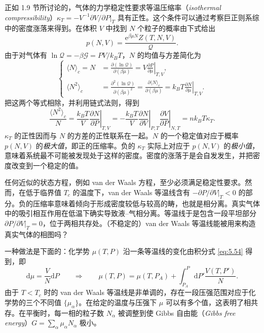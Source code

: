 正如 1.9 节所讨论的，气体的力学稳定性要求等温压缩率（\textit{isothermal compressibility}）$\kappa_T=-V^{-1}\left.\partial V/\partial P\right|_T$ 具有正性。这个条件可以通过考察巨正则系综中的密度涨落来得到。在体积 $V$ 中找到 $N$ 个粒子的概率由下式给出
\begin{equation}\label{eq:5.53}
p(N,V)=\frac{\mathrm{e}^{\beta\mu N}Z(T,N,V)}{\mathcal{Q}}.
\end{equation}
由于对气体有 $\ln\mathcal{Q}=-\beta\mathcal{G}=PV/k_BT$，$N$ 的均值与方差简化为
\begin{equation}\label{eq:5.54}
\left\{
\begin{aligned}
\langle N\rangle_c=N&=\frac{\partial(\ln\mathcal{Q})}{\partial(\beta\mu)}=V\left.\frac{\partial P}{\partial\mu}\right|_{T,V},\\
\langle N^2\rangle_c&=\frac{\partial^2(\ln\mathcal{Q})}{\partial(\beta\mu)^2}=\frac{\partial\langle N\rangle_c}{\partial(\beta\mu)}=k_BT\left.\frac{\partial N}{\partial\mu}\right|_{T,V}.
\end{aligned}
\right.
\end{equation}
把这两个等式相除，并利用链式法则，得到
\begin{equation}\label{eq:5.55}
\frac{\langle N^2\rangle_c}{N}=\frac{k_BT}{V}\left.\frac{\partial N}{\partial P}\right|_{T,V}=-\frac{k_BT}{V}\left.\frac{\partial N}{\partial V}\right|_{P,T}\left.\frac{\partial V}{\partial P}\right|_{N,T}=nk_BT\kappa_T.
\end{equation}
$\kappa_T$ 的正性因而与 $N$ 的方差的正性联系在一起。$N$ 的一个稳定值对应于概率 $p(N,V)$ 的\emph{极大值}，即正的压缩率。负的 $\kappa_T$ 实际上对应于 $p(N,V)$ 的\emph{极小值}，意味着系统最不可能被发现处于这样的密度。密度的涨落于是会自发发生，并把密度改变到一个稳定的值。

任何近似的状态方程，例如 van der Waals 方程，至少必须满足稳定性要求。然而，在低于临界值 $T_c$ 的温度下，van der Waals 等温线含有 $\left.-\partial P/\partial V\right|_T<0$ 的部分。负的压缩率意味着倾向于形成密度较低与较高的畴，也就是相分离。真实气体中的吸引相互作用在低温下确实导致液--气相分离。等温线于是包含一段平坦部分 $\left.\partial P/\partial V\right|_T=0$，位于两相共存处。（不稳定的）van der Waals 等温线能被用来构造真实气体的相图吗？

一种做法是下面的：化学势 $\mu(T,P)$ 沿一条等温线的变化由积分式 \eqref{eq:5.54} 得到，即
\begin{equation}\label{eq:5.56}
\mathrm{d}\mu=\frac{V}{N}\mathrm{d}P\qquad\Longrightarrow\qquad\mu(T,P)=\mu(T,P_A)+\int_{P_A}^{P}\mathrm{d}P'\frac{V(T,P')}{N}.
\end{equation}
由于 $T<T_c$ 时的 van der Waals 等温线是非单调的，存在一段压强范围对应于化学势的三个不同值 $\{\mu_\alpha\}$。在给定的温度与压强下 $\mu$ 可以有多个值，这表明了相共存。在平衡时，每一相的粒子数 $N_\alpha$ 被调整到使 Gibbs 自由能（\textit{Gibbs free energy}）$G=\sum_\alpha\mu_\alpha N_\alpha$ 极小。

